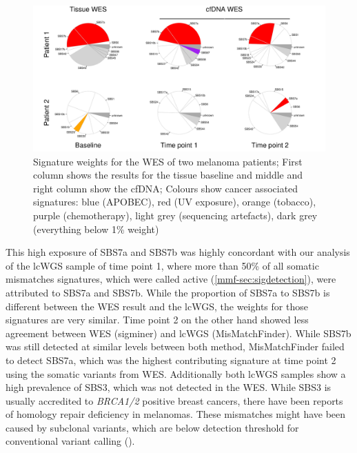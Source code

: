 \begin{figure}[ht]
\centering
\includegraphics[width=.99\linewidth]{Figures/MisMatchFinder/melanomaWESsignatures.pdf}
\caption[Signature weights for the WES of two melanoma patients]{Signature weights for the WES of two melanoma patients; First column shows the results for the tissue baseline and middle and right column show the cfDNA; Colours show cancer associated signatures: blue (APOBEC), red (UV exposure), orange (tobacco), purple (chemotherapy), light grey (sequencing artefacts), dark grey (everything below 1\% weight)}\label{fig:mmf-melaWESsigPie}
\end{figure}
 
This high exposure of SBS7a and SBS7b was highly concordant with our analysis of the lcWGS sample of time point 1, where more than 50\% of all somatic mismatches signatures, which were called active (\autoref{mmf-sec:sigdetection}), were attributed to SBS7a and SBS7b. While the proportion of SBS7a to SBS7b is different between the WES result and the lcWGS, the weights for those signatures are very similar. Time point 2 on the other hand showed less agreement between WES (sigminer) and lcWGS (MisMatchFinder). While SBS7b was still detected at similar levels between both method, MisMatchFinder failed to detect SBS7a, which was the highest contributing signature at time point 2 using the somatic variants from WES. Additionally both lcWGS samples show a high prevalence of SBS3, which was not detected in the WES. While SBS3 is usually accredited to \textit{BRCA1/2} positive breast cancers, there have been reports of homology repair deficiency in melanomas. These mismatches might have been caused by subclonal variants, which are below detection threshold for conventional variant calling ().

